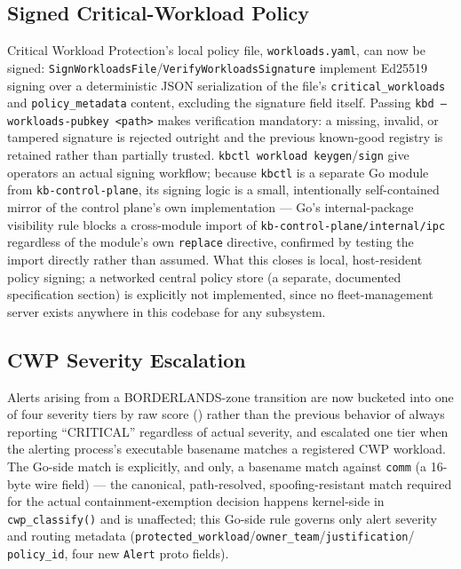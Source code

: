 \documentclass{article}
\begin{document}
\subsection{Signed Critical-Workload Policy}
\label{sec:cwp-sign}

Critical Workload Protection's local policy file, \texttt{workloads.yaml},
can now be signed: \texttt{SignWorkloadsFile}/\texttt{VerifyWorkloadsSignature}
implement Ed25519 signing over a deterministic JSON serialization of
the file's \texttt{critical\_workloads} and \texttt{policy\_metadata}
content, excluding the signature field itself. Passing
\texttt{kbd --workloads-pubkey <path>} makes verification mandatory: a
missing, invalid, or tampered signature is rejected outright and the
previous known-good registry is retained rather than partially
trusted. \texttt{kbctl workload keygen}/\texttt{sign} give operators an
actual signing workflow; because \texttt{kbctl} is a separate Go module
from \texttt{kb-control-plane}, its signing logic is a small,
intentionally self-contained mirror of the control plane's own
implementation --- Go's internal-package visibility rule blocks a
cross-module import of \texttt{kb-control-plane/internal/ipc}
regardless of the module's own \texttt{replace} directive, confirmed by
testing the import directly rather than assumed. What this closes is
local, host-resident policy signing; a networked central policy store
(a separate, documented specification section) is explicitly not
implemented, since no fleet-management server exists anywhere in this
codebase for any subsystem.

\subsection{CWP Severity Escalation}
\label{sec:severity}

Alerts arising from a BORDERLANDS-zone transition are now bucketed
into one of four severity tiers by raw score ()
rather than the previous behavior of always reporting ``CRITICAL''
regardless of actual severity, and escalated one tier when the
alerting process's executable basename matches a registered CWP
workload. The Go-side match is explicitly, and only, a basename match
against \texttt{comm} (a 16-byte wire field) --- the canonical,
path-resolved, spoofing-resistant match required for the actual
containment-exemption decision happens kernel-side in
\texttt{cwp\_classify()} and is unaffected; this Go-side rule governs
only alert severity and routing metadata
(\texttt{protected\_workload}/\texttt{owner\_team}/\texttt{justification}/
\texttt{policy\_id}, four new \texttt{Alert} proto fields).
\end{document}
